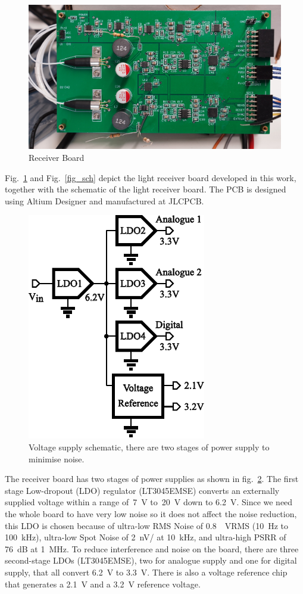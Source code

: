 \begin{figure}[H]
\centering
\includegraphics[width=0.9\linewidth]{4-ANC_Sys/ReceiverBoard.jpg}
\caption{Receiver Board}
\label{fig_ReceiverBoard}
\end{figure}

Fig.~\ref{fig_ReceiverBoard} and Fig.~\ref{fig_sch} depict the light receiver board developed in this work, together with the schematic of the light receiver board.  The PCB is designed using Altium Designer and manufactured at JLCPCB.

\begin{figure}[H]
\centering
\includegraphics[width=0.4\linewidth]{4-ANC_Sys/PowerSupSch.pdf}
\caption{Voltage supply schematic, there are two stages of power supply to minimise noise.}
\label{fig_PowerSupSch}
\end{figure}

The receiver board has two stages of power supplies as shown in fig.~\ref{fig_PowerSupSch}.  The first stage Low-dropout (LDO) regulator (LT3045EMSE) converts an externally supplied voltage within a range of~\qty{7}{V} to~\qty{20}{V} down to \qty{6.2}{V}.  Since we need the whole board to have very low noise so it does not affect the noise reduction, this LDO is chosen because of ultra-low RMS Noise of \qty{0.8}{\mu VRMS} (\qty{10}{Hz} to \qty{100}{kHz}), ultra-low Spot Noise of \qty{2}{nV/\sqrthz} at \qty{10}{kHz}, and ultra-high PSRR of \qty{76}{dB} at \qty{1}{MHz}.  To reduce interference and noise on the board, there are three second-stage LDOs (LT3045EMSE), two for analogue supply and one for digital supply, that all convert \qty{6.2}{V} to \qty{3.3}{V}.  There is also a voltage reference chip that generates a \qty{2.1}{V} and a \qty{3.2}{V} reference voltage.

